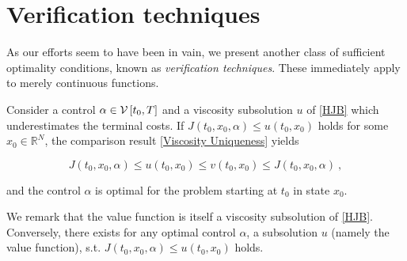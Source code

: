 \section{Verification techniques}

As our efforts seem to have been in vain, we present another class of sufficient optimality conditions, known as \emph{verification techniques}. These immediately apply to merely continuous functions.

Consider a control $ \alpha \in \mathcal{V}\left[ {t_0}, T \right] $ and a viscosity subsolution $ u $ of \eqref{HJB} which underestimates the terminal costs. If $ J(t_0, x_0, \alpha) \leq u(t_0, x_0) $ holds for some $ x_0 \in \mathbb{R}^N $, the comparison result \ref{Viscosity Uniqueness} yields

\begin{equation*}
	J(t_0, x_0, \alpha) \leq u(t_0, x_0) \leq v(t_0, x_0) \leq J(t_0, x_0, \alpha) \ ,
\end{equation*}

and the control $ \alpha $ is optimal for the problem starting at $ t_0 $ in state $ x_0 $.

We remark that the value function is itself a viscosity subsolution of \eqref{HJB}. Conversely, there exists for any optimal control $ \alpha $, a subsolution $ u $ (namely the value function), s.t. $ J(t_0, x_0, \alpha) \leq u(t_0, x_0) $ holds.